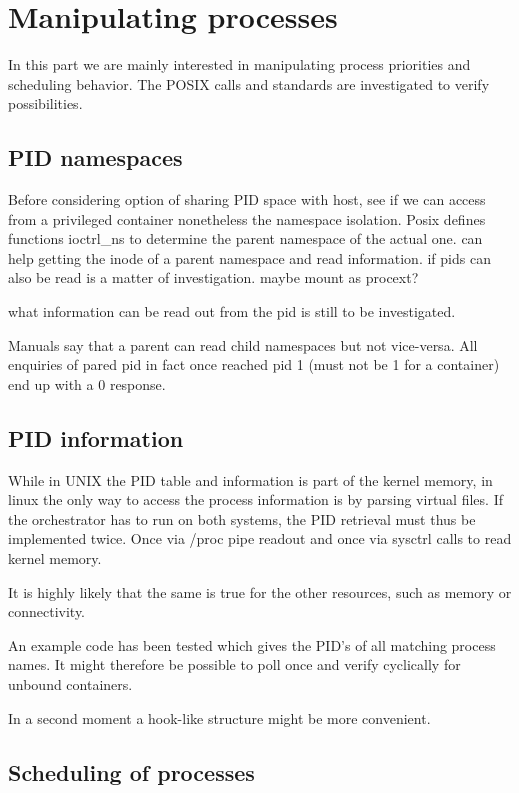 \documentclass[]{scrartcl}
\begin{document}
\section{Manipulating processes}

In this part we are mainly interested in manipulating process priorities and scheduling behavior. 
The POSIX calls and standards are investigated to verify possibilities.

\subsection{PID namespaces}

Before considering option of sharing PID space with host, see if we can access from a privileged container nonetheless the namespace isolation. 
Posix defines functions ioctrl\_ns to determine the parent namespace of the actual one. can help getting the inode of a parent namespace and read information. 
if pids can also be read is a matter of investigation. maybe mount as \/procext?

what information can be read out from the pid is still to be investigated.

Manuals say that a parent can read child namespaces but not vice-versa. All enquiries of pared pid in fact once reached pid 1 (must not be 1 for a container) end up with a 0 response.

\subsection{PID information}

While in UNIX the PID table and information is part of the kernel memory, in linux the only way to access the process information is by parsing virtual files. 
If the orchestrator has to run on both systems, the PID retrieval must thus be implemented twice. Once via /proc pipe readout and once via sysctrl calls to read kernel memory.

It is highly likely that the same is true for the other resources, such as memory or connectivity. 

An example code has been tested which gives the PID's of all matching process names. 
It might therefore be possible to poll once and verify cyclically for unbound containers. 

In a second moment a hook-like structure might be more convenient.

\subsection{Scheduling of processes}
\end{document}
